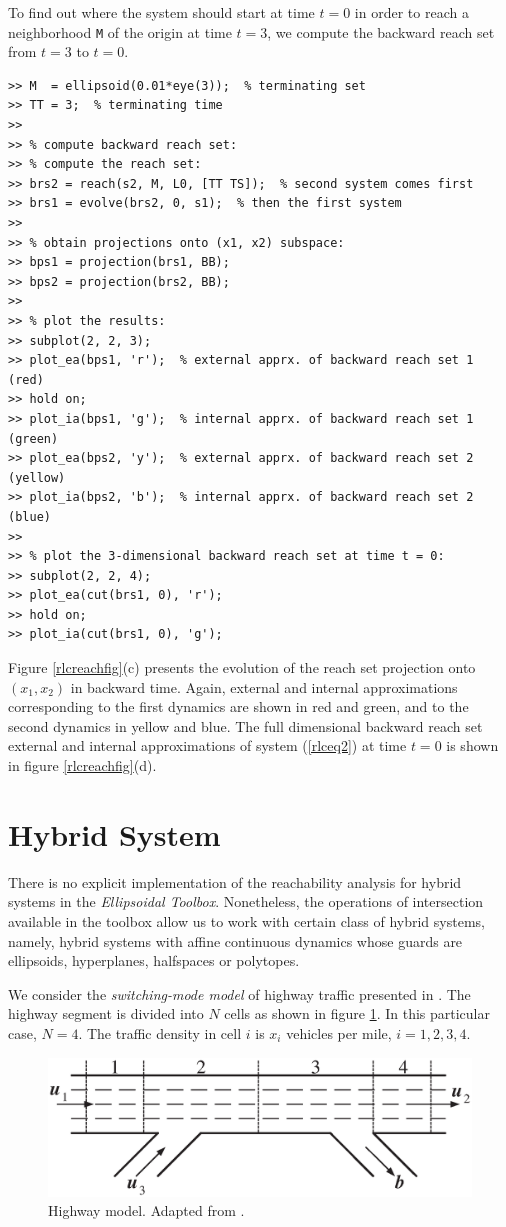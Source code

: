 To find out where the system should start at time $t=0$ in order to reach
a neighborhood {\tt M} of the origin at time $t=3$,
we compute the backward reach set from $t=3$ to $t=0$.
{\tt \begin{verbatim}
>> M  = ellipsoid(0.01*eye(3));  % terminating set
>> TT = 3;  % terminating time
>>
>> % compute backward reach set:
>> % compute the reach set:
>> brs2 = reach(s2, M, L0, [TT TS]);  % second system comes first
>> brs1 = evolve(brs2, 0, s1);  % then the first system
>>
>> % obtain projections onto (x1, x2) subspace:
>> bps1 = projection(brs1, BB);
>> bps2 = projection(brs2, BB);
>>
>> % plot the results:
>> subplot(2, 2, 3);
>> plot_ea(bps1, 'r');  % external apprx. of backward reach set 1 (red)
>> hold on;
>> plot_ia(bps1, 'g');  % internal apprx. of backward reach set 1 (green)
>> plot_ea(bps2, 'y');  % external apprx. of backward reach set 2 (yellow)
>> plot_ia(bps2, 'b');  % internal apprx. of backward reach set 2 (blue)
>>
>> % plot the 3-dimensional backward reach set at time t = 0:
>> subplot(2, 2, 4);
>> plot_ea(cut(brs1, 0), 'r');
>> hold on;
>> plot_ia(cut(brs1, 0), 'g');
\end{verbatim}}
Figure \ref{rlcreachfig}(c) presents the evolution of the reach set
projection onto $(x_1, x_2)$ in backward time.
Again, external and internal approximations corresponding
to the first dynamics are shown in red and green, and
to the second dynamics in yellow and blue. The
full dimensional backward reach set external and internal
approximations of system (\ref{rlceq2})
at time $t=0$ is shown in figure \ref{rlcreachfig}(d).



\section{Hybrid System}
There is no explicit implementation of the reachability analysis for hybrid
systems in the {\it Ellipsoidal Toolbox}.
Nonetheless, the operations of intersection available in the toolbox allow us
to work with certain class of hybrid systems, namely,
hybrid systems with affine continuous dynamics whose guards are
ellipsoids, hyperplanes, halfspaces or polytopes.

We  consider the {\it switching-mode model} of highway traffic
presented in \cite{munoz03}. The highway segment is divided into $N$ cells
as shown in figure \ref{hwfig}. In this particular case, $N=4$.
The traffic density in cell $i$ is  $x_i$ vehicles per mile, $i=1,2,3,4$.
\begin{figure}[htbp]
\centerline{
\includegraphics[height=5 cm]{hw.eps}}
\caption{Highway model. Adapted from \cite{munoz03}.}
\label{hwfig}
\end{figure}

